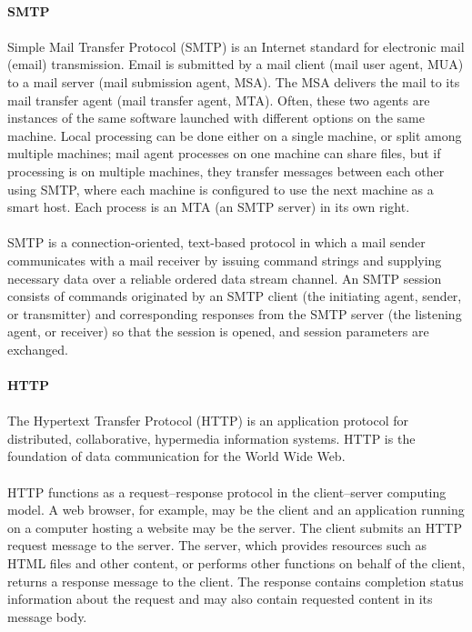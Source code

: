 \paragraph{} \textbf{SMTP}
\paragraph{}
Simple Mail Transfer Protocol (SMTP) is an Internet standard for electronic mail (email) transmission. Email is submitted by a mail client (mail user agent, MUA) to a mail server (mail submission agent, MSA). The MSA delivers the mail to its mail transfer agent (mail transfer agent, MTA). Often, these two agents are instances of the same software launched with different options on the same machine. Local processing can be done either on a single machine, or split among multiple machines; mail agent processes on one machine can share files, but if processing is on multiple machines, they transfer messages between each other using SMTP, where each machine is configured to use the next machine as a smart host. Each process is an MTA (an SMTP server) in its own right.
\paragraph{}
SMTP is a connection-oriented, text-based protocol in which a mail sender communicates with a mail receiver by issuing command strings and supplying necessary data over a reliable ordered data stream channel. An SMTP session consists of commands originated by an SMTP client (the initiating agent, sender, or transmitter) and corresponding responses from the SMTP server (the listening agent, or receiver) so that the session is opened, and session parameters are exchanged.

\paragraph{} \textbf{HTTP}
\paragraph{}
The Hypertext Transfer Protocol (HTTP) is an application protocol for distributed, collaborative, hypermedia information systems. HTTP is the foundation of data communication for the World Wide Web.
\paragraph{}
HTTP functions as a request–response protocol in the client–server computing model. A web browser, for example, may be the client and an application running on a computer hosting a website may be the server. The client submits an HTTP request message to the server. The server, which provides resources such as HTML files and other content, or performs other functions on behalf of the client, returns a response message to the client. The response contains completion status information about the request and may also contain requested content in its message body.

